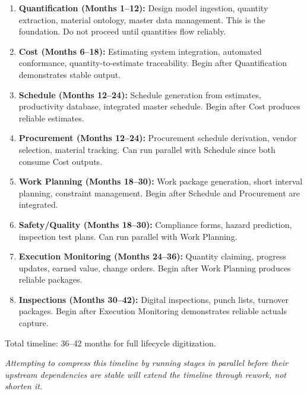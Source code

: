 \documentclass[11pt, letterpaper]{article}
\begin{document}
\begin{enumerate}
    \item \textbf{Quantification (Months 1--12):} Design model ingestion, quantity extraction, material ontology, master data management. This is the foundation. Do not proceed until quantities flow reliably.
    
    \item \textbf{Cost (Months 6--18):} Estimating system integration, automated conformance, quantity-to-estimate traceability. Begin after Quantification demonstrates stable output.
    
    \item \textbf{Schedule (Months 12--24):} Schedule generation from estimates, productivity database, integrated master schedule. Begin after Cost produces reliable estimates.
    
    \item \textbf{Procurement (Months 12--24):} Procurement schedule derivation, vendor selection, material tracking. Can run parallel with Schedule since both consume Cost outputs.
    
    \item \textbf{Work Planning (Months 18--30):} Work package generation, short interval planning, constraint management. Begin after Schedule and Procurement are integrated.
    
    \item \textbf{Safety/Quality (Months 18--30):} Compliance forms, hazard prediction, inspection test plans. Can run parallel with Work Planning.
    
    \item \textbf{Execution Monitoring (Months 24--36):} Quantity claiming, progress updates, earned value, change orders. Begin after Work Planning produces reliable packages.
    
    \item \textbf{Inspections (Months 30--42):} Digital inspections, punch lists, turnover packages. Begin after Execution Monitoring demonstrates reliable actuals capture.
\end{enumerate}

\vspace{0.5em}

Total timeline: 36--42 months for full lifecycle digitization.

\vspace{0.5em}

\textit{Attempting to compress this timeline by running stages in parallel before their upstream dependencies are stable will extend the timeline through rework, not shorten it.}
\end{document}
